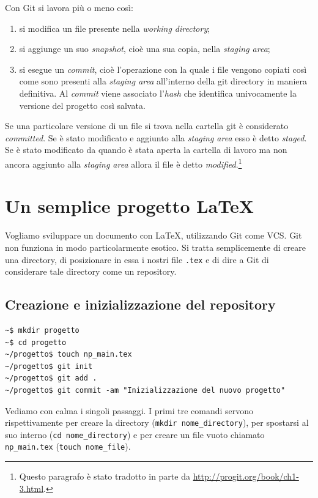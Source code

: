 \documentclass[a4paper,12pt,oneside]{article}
\begin{document}
Con Git si lavora più o meno così:
\begin{enumerate}
\item si modifica un file presente nella \emph{working directory};
\item si aggiunge un suo \emph{snapshot}, cioè una sua copia, nella \emph{staging
    area};
\item si esegue un \emph{commit}, cioè l'operazione con la quale i file vengono
  copiati così come sono presenti alla \emph{staging area} all'interno della
  git directory in maniera definitiva. Al \emph{commit} viene associato
  l'\emph{hash} che identifica univocamente la versione del progetto così salvata.
\end{enumerate}
Se una particolare versione di un file si trova nella cartella git è considerato
\emph{committed}. Se è stato modificato e aggiunto alla \emph{staging area} esso
è detto \emph{staged}. Se è stato modificato da quando è stata aperta la cartella
di lavoro ma non ancora aggiunto alla \emph{staging area} allora il file è detto
\emph{modified}.\footnote{Questo paragrafo è stato tradotto in parte da
  \url{http://progit.org/book/ch1-3.html}.}

\section{Un semplice progetto \LaTeX}
Vogliamo sviluppare un documento con \LaTeX, utilizzando Git come VCS.
Git non funziona in modo particolarmente esotico. Si tratta semplicemente di
creare una directory, di posizionare in essa i nostri file \lstinline|.tex| e di
dire a Git di considerare tale directory come un repository.
\subsection{Creazione e inizializzazione del repository}
\begin{lstlisting}
~$ mkdir progetto
~$ cd progetto
~/progetto$ touch np_main.tex
~/progetto$ git init
~/progetto$ git add .
~/progetto$ git commit -am "Inizializzazione del nuovo progetto"
\end{lstlisting}
Vediamo con calma i singoli passaggi. I primi tre comandi servono
rispettivamente per creare la directory (\lstinline|mkdir nome_directory|),
per spostarsi al suo interno (\lstinline|cd nome_directory|) e per creare
un file vuoto chiamato \lstinline|np_main.tex| (\lstinline|touch nome_file|).
\end{document}
